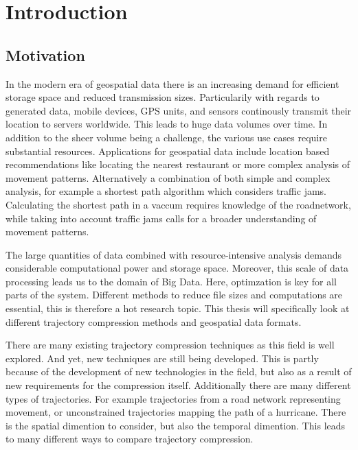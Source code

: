\section{Introduction}

\subsection{Motivation}
In the modern era of geospatial data there is an increasing demand for efficient storage space and reduced transmission sizes. Particularily with regards to generated data, mobile devices, GPS units, and sensors continously transmit their location to servers worldwide. This leads to huge data volumes over time. In addition to the sheer volume being a challenge, the various use cases require substantial resources. Applications for geospatial data include location based recommendations like locating the nearest restaurant or more complex analysis of movement patterns. Alternatively a combination of both simple and complex analysis, for example a shortest path algorithm which considers traffic jams. Calculating the shortest path in a vaccum requires knowledge of the roadnetwork, while taking into account traffic jams calls for a broader understanding of movement patterns.

The large quantities of data combined with resource-intensive analysis demands considerable computational power and storage space. Moreover, this scale of data processing leads us to the domain of Big Data. Here, optimzation is key for all parts of the system. Different methods to reduce file sizes and computations are essential, this is therefore a hot research topic. This thesis will specifically look at different trajectory compression methods and geospatial data formats.

There are many existing trajectory compression techniques as this field is well explored. And yet, new techniques are still being developed. This is partly because of the development of new technologies in the field, but also as a result of new requirements for the compression itself. Additionally there are many different types of trajectories. For example trajectories from a road network representing movement, or unconstrained trajectories mapping the path of a hurricane. There is the spatial dimention to consider, but also the temporal dimention. This leads to many different ways to compare trajectory compression.

